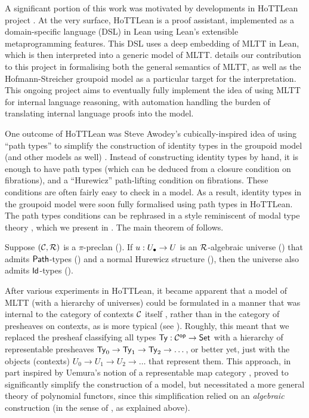 A significant portion of this work was motivated by
developments in HoTTLean project \cite{hua2025}.
At the very surface,
HoTTLean is a proof assistant, 
implemented as a domain-specific language (DSL) in Lean
using Lean's extensible metaprogramming features.
This DSL uses a deep embedding of MLTT in Lean,
which is then interpreted into a generic model of MLTT.
 details our contribution to this project
in formalising both the general semantics of MLTT,
as well as the Hofmann-Streicher groupoid model \cite{hofmann1995}
as a particular target for the interpretation.
This ongoing project aims to eventually fully implement
the idea of using MLTT for internal language reasoning,
with automation handling the burden of translating internal language proofs
into the model.

One outcome of HoTTLean was Steve Awodey's
cubically-inspired idea of using ``path types''
to simplify the construction of identity types in the groupoid model
(and other models as well) \cite{awodey2026}.
Instead of constructing identity types by hand,
it is enough to have path types
(which can be deduced from a closure condition on fibrations),
and a ``Hurewicz'' path-lifting condition on fibrations.
These conditions are often fairly easy to check in a model.
As a result,
identity types in the groupoid model were soon fully
formalised using path types in HoTTLean.
The path types conditions can be rephrased in a style
reminiscent of modal type theory \cite{licata2016,licata2017},
which we present in .
The main theorem of  follows.
\begin{theorem*}
  Suppose $(\mathcal{C},\mathcal{R})$ is a $\pi$-preclan ().
  If ${u} : {U_\bullet} \to U$ is an $\mathcal{R}$-algebraic universe () that
  admits $\mathop{\mathsf{Path}}$-types ()
  and a normal Hurewicz structure (),
  then the universe also admits $\mathsf{Id}$-types ().
\end{theorem*}
 
After various experiments in HoTTLean,
it became apparent that a model of MLTT (with a hierarchy of universes)
could be formulated in a manner that was internal
to the category of contexts $\mathcal{C}$ itself \cite{hua2026},
rather than in the category of presheaves on contexts,
as is more typical (see \cite{clairambault2011, awodey2018}).
Roughly, this meant that we replaced the presheaf classifying all types
$\mathsf{Ty} : \mathcal{C}^{\mathsf{op}} \to \mathsf{Set}$
with a hierarchy of representable presheaves $\mathsf{Ty}_0 \to \mathsf{Ty}_1 \to \mathsf{Ty}_2 \to \dots$,
or better yet, just with the objects (contexts)
$U_0 \to U_1 \to U_2 \to \dots$ that represent them.
This approach,
in part inspired by Uemura's notion of a representable map category
\cite{uemura2023},
proved to significantly simplify the construction of a model,
but necessitated a more general theory of polynomial functors,
since this simplification relied on an \emph{algebraic} construction
(in the sense of \cite{awodey2025}, as explained above).

